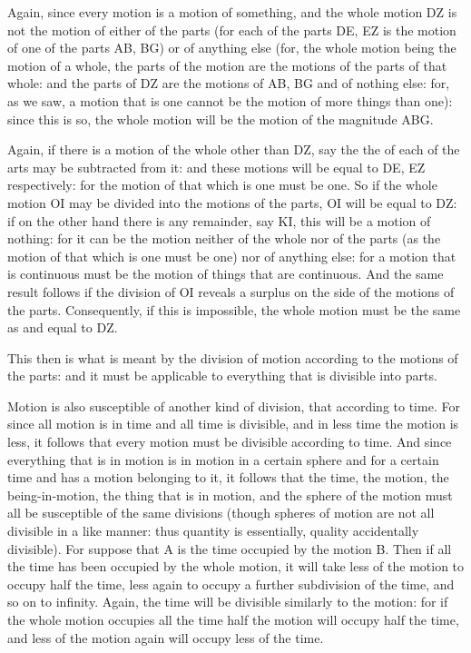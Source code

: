 Again, since every motion is a motion of something, and the whole
motion DZ is not the motion of either of the parts (for each of the
parts DE, EZ is the motion of one of the parts AB, BG) or of anything
else (for, the whole motion being the motion of a whole, the parts
of the motion are the motions of the parts of that whole: and the
parts of DZ are the motions of AB, BG and of nothing else: for, as
we saw, a motion that is one cannot be the motion of more things than
one): since this is so, the whole motion will be the motion of the
magnitude ABG. 

Again, if there is a motion of the whole other than DZ, say the the
of each of the arts may be subtracted from it: and these motions will
be equal to DE, EZ respectively: for the motion of that which is one
must be one. So if the whole motion OI may be divided into the motions
of the parts, OI will be equal to DZ: if on the other hand there is
any remainder, say KI, this will be a motion of nothing: for it can
be the motion neither of the whole nor of the parts (as the motion
of that which is one must be one) nor of anything else: for a motion
that is continuous must be the motion of things that are continuous.
And the same result follows if the division of OI reveals a surplus
on the side of the motions of the parts. Consequently, if this is
impossible, the whole motion must be the same as and equal to DZ.

This then is what is meant by the division of motion according to
the motions of the parts: and it must be applicable to everything
that is divisible into parts. 

Motion is also susceptible of another kind of division, that according
to time. For since all motion is in time and all time is divisible,
and in less time the motion is less, it follows that every motion
must be divisible according to time. And since everything that is
in motion is in motion in a certain sphere and for a certain time
and has a motion belonging to it, it follows that the time, the motion,
the being-in-motion, the thing that is in motion, and the sphere of
the motion must all be susceptible of the same divisions (though spheres
of motion are not all divisible in a like manner: thus quantity is
essentially, quality accidentally divisible). For suppose that A is
the time occupied by the motion B. Then if all the time has been occupied
by the whole motion, it will take less of the motion to occupy half
the time, less again to occupy a further subdivision of the time,
and so on to infinity. Again, the time will be divisible similarly
to the motion: for if the whole motion occupies all the time half
the motion will occupy half the time, and less of the motion again
will occupy less of the time. 

